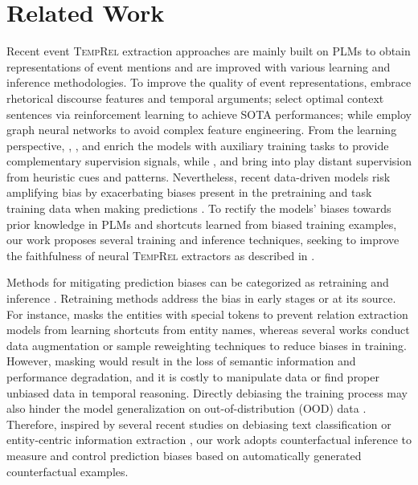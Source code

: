 \documentclass[11pt]{article}
\newcommand{\temprel}{\textsc{TempRel}\xspace}
\newcommand{\stitle}[1]{\vspace{1ex}\noindent{\bf #1}}
\begin{document}
\section{Related Work}



\stitle{Event \temprel Extraction.}
Recent event \temprel extraction approaches are mainly built on PLMs to obtain representations of event mentions and are improved with various learning and inference methodologies. 
To improve the quality of event representations, \citet{mathur-etal-2021-timers} embrace rhetorical discourse features and temporal arguments; \citet{trong2022selecting} select optimal context sentences via reinforcement learning to achieve SOTA performances; while \citet{liu2021discourse,mathur-etal-2021-timers,qiang-naacl-2022} employ graph neural networks to avoid complex feature engineering.
From the learning perspective, \citet{ning-etal-2018-joint}, \citet{ballesteros-etal-2020-severing}, and \citet{wang-etal-2020-joint} enrich the models with auxiliary training tasks to provide complementary supervision signals, while \citet{ning-etal-2018-improving}, \citet{zhao-etal-2021-effective} and \citet{zhou-etal-2021-temporal} bring into play distant supervision from heuristic cues and patterns.
Nevertheless, recent data-driven models risk amplifying bias by exacerbating biases present in the pretraining and task training data when making predictions \cite{zhao-etal-2017-men}. 
To rectify the models' biases towards prior knowledge in PLMs and shortcuts learned from biased training examples, our work proposes several training and inference techniques, seeking to improve the faithfulness of neural \temprel extractors as described in .

\stitle{Bias Mitigation in NLP.} 
Methods for mitigating prediction biases can be categorized as retraining and inference \cite{sun-etal-2019-mitigating}.
Retraining methods address the bias in early stages or at its source.
For instance, \citet{zhang-etal-2017-position} masks the entities with special tokens to prevent relation extraction models from learning shortcuts from entity names, whereas several works conduct data augmentation \cite{park-etal-2018-reducing,alzantot-etal-2018-generating,Jin_Jin_Zhou_Szolovits_2020,wu-etal-2022-generating} or sample reweighting techniques \cite{lin2017focal,liu2021just} to reduce biases in training. However, masking would result in the loss of semantic information and performance degradation, and it is costly to manipulate data or find proper unbiased data in temporal reasoning.
Directly debiasing the training process may also hinder the model generalization on out-of-distribution (OOD) data \cite{wang2022should}.
Therefore, inspired by several recent studies on debiasing text classification or entity-centric information extraction \cite{qian-etal-2021-counterfactual, nan-etal-2021-uncovering}, our work adopts counterfactual inference to measure and control prediction biases based on automatically generated counterfactual examples. 
\end{document}
